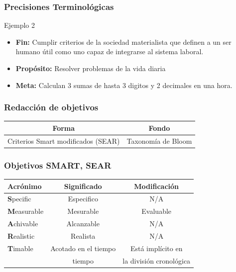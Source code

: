 \documentclass{beamer}
\begin{document}
\begin{frame}
\frametitle{Precisiones Terminol\'ogicas}
\begin{block}{Ejemplo 2 }
\begin{itemize}
\item \textbf{Fin:} Cumplir criterios de la sociedad materialista  que definen a un ser humano \'util como uno capaz de integrarse al sistema laboral.
\item \textbf{Prop\'osito:} Resolver problemas de la vida diaria 
\item \textbf{Meta:} Calculan 3 sumas de hasta 3 digitos y 2 decimales  en una hora. 
\end{itemize}
\end{block}
\end{frame}

\begin{frame}
\frametitle{Redacci\'on de objetivos}
\begin{center}
\begin{table}
\begin{tabular}{|c|c|}
\hline
\textbf{Forma}&\textbf{Fondo}\\
\hline
Criterios Smart modificados (SEAR) &Taxonom\'ia de Bloom \\
\hline
\end{tabular}
\end{table}
\end{center}
\end{frame}

\begin{frame}
\frametitle{Objetivos SMART, SEAR}
\begin{center}
\begin{table}
\begin{tabular}{|l|c|c|}
\hline
\textbf{Acr\'onimo}&\textbf{Significado}&\textbf{Modificaci\'on}\\
\hline
\textbf{S}pecific &Especifico & N/A \\
\textbf{M}easurable&Mesurable & Evaluable  \\
\textbf{A}chivable &Alcanzable & N/A \\
\textbf{R}ealistic &Realista & N/A \\
\textbf{T}imable &Acotado en el tiempo & Est\'a impl\'icito en \\
 &tiempo & la divisi\'on cronol\'ogica\\
\hline
\end{tabular}
\end{table}
\end{center}

\end{frame}
\end{document}
